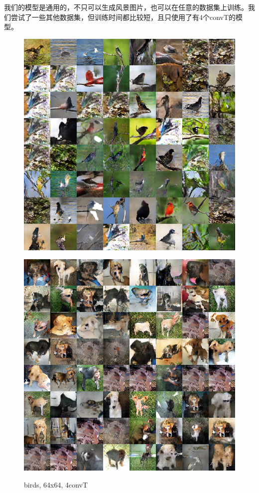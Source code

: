 \documentclass{article}
\begin{document}
\begin{CJK*}{UTF8}{gbsn}
	我们的模型是通用的，不只可以生成风景图片，也可以在任意的数据集上训练。我们尝试了一些其他数据集，但训练时间都比较短，且只使用了有4个convT的模型。

	\begin{figure}[htbp]
		\begin{minipage}{0.5\linewidth}
			\label{bi}
			\centering\includegraphics[scale=0.35]{res/bird_gen.png}
			\caption{birds, 64x64, 4convT}
		\end{minipage}
		\begin{minipage}{0.5\linewidth}
			\label{do}
			\centering\includegraphics[scale=0.35]{res/dog.png}

\end{minipage}
\end{figure}
\end{CJK*}
\end{document}

